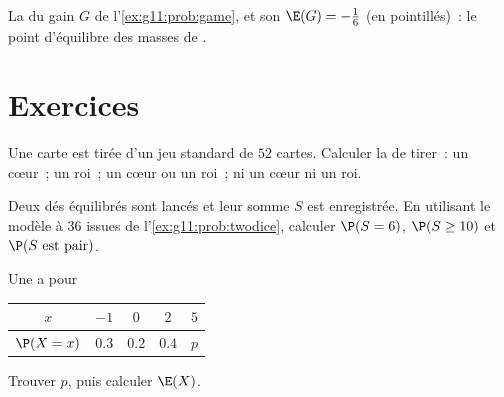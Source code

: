 \begin{omfigure}

{\small La  du gain $G$ de l'\cref{ex:g11:prob:game}, et son 
$\E(G) = -\frac16$ (en pointillés)~: le point d'équilibre des masses de
.}
\end{omfigure}

\section{Exercices}

\begin{exercise}[$\star$]\label{exo:g11:prob:1}
Une carte est tirée d'un jeu standard de $52$ cartes. Calculer la
 de tirer~: un cœur~; un roi~; un cœur ou un roi~; ni un cœur
ni un roi.
\end{exercise}

\begin{exercise}[$\star$]\label{exo:g11:prob:2}
Deux dés équilibrés sont lancés et leur somme $S$ est enregistrée. En
utilisant le modèle à $36$ issues de l'\cref{ex:g11:prob:twodice},
calculer $\P(S = 6)$, $\P(S \geq 10)$ et $\P(S \text{ est pair})$.
\end{exercise}

\begin{exercise}[$\star$]\label{exo:g11:prob:3}
Une  a pour 
\begin{center}
\begin{tabular}{c|cccc}
$x$ & $-1$ & $0$ & $2$ & $5$\\
\hline
$\P(X=x)$ & $0.3$ & $0.2$ & $0.4$ & $p$
\end{tabular}
\end{center}
Trouver $p$, puis calculer $\E(X)$.
\end{exercise}

